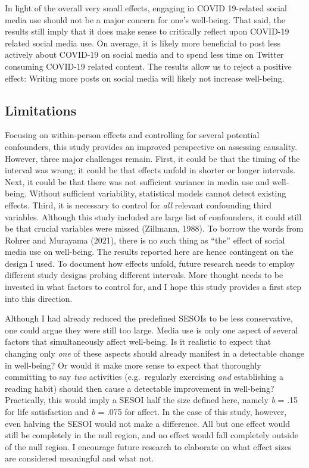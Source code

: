\documentclass[
  man,mask,floatsintext]{apa7}
\begin{document}
In light of the overall very small effects, engaging in COVID 19-related social media use should not be a major concern for one's well-being.
That said, the results still imply that it does make sense to critically reflect upon COVID-19 related social media use.
On average, it is likely more beneficial to post less actively about COVID-19 on social media and to spend less time on Twitter consuming COVID-19 related content.
The results allow us to reject a positive effect: Writing more posts on social media will likely not increase well-being.

\hypertarget{limitations}{%
\subsection{Limitations}\label{limitations}}

Focusing on within-person effects and controlling for several potential confounders, this study provides an improved perspective on assessing causality.
However, three major challenges remain.
First, it could be that the timing of the interval was wrong; it could be that effects unfold in shorter or longer intervals.
Next, it could be that there was not sufficient variance in media use and well-being.
Without sufficient variability, statistical models cannot detect existing effects.
Third, it is necessary to control for \emph{all} relevant confounding third variables.
Although this study included are large list of confounders, it could still be that crucial variables were missed (Zillmann, 1988).
To borrow the words from Rohrer and Murayama (2021), there is no such thing as ``the'' effect of social media use on well-being.
The results reported here are hence contingent on the design I used.
To document how effects unfold, future research needs to employ different study designs probing different intervals.
More thought needs to be invested in what factors to control for, and I hope this study provides a first step into this direction.

Although I had already reduced the predefined SESOIs to be less conservative, one could argue they were still too large.
Media use is only one aspect of several factors that simultaneously affect well-being.
Is it realistic to expect that changing only \emph{one} of these aspects should already manifest in a detectable change in well-being?
Or would it make more sense to expect that thoroughly committing to say \emph{two} activities (e.g.~regularly exercising \emph{and} establishing a reading habit) should then cause a detectable improvement in well-being?
Practically, this would imply a SESOI half the size defined here, namely \emph{b} = \textbar.15\textbar{} for life satisfaction and \emph{b} = \textbar.075\textbar{} for affect.
In the case of this study, however, even halving the SESOI would not make a difference.
All but one effect would still be completely in the null region, and no effect would fall completely outside of the null region.
I encourage future research to elaborate on what effect sizes are considered meaningful and what not.
\end{document}
